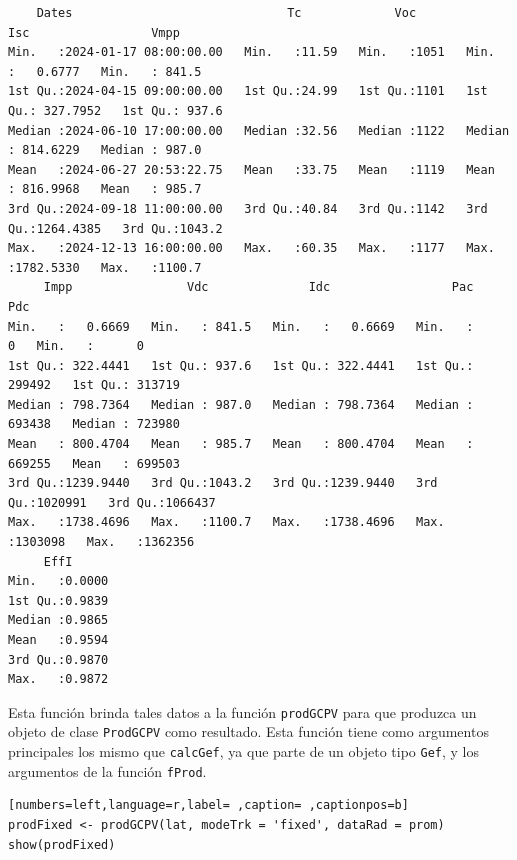 \begin{verbatim}
    Dates                              Tc             Voc            Isc                 Vmpp       
Min.   :2024-01-17 08:00:00.00   Min.   :11.59   Min.   :1051   Min.   :   0.6777   Min.   : 841.5  
1st Qu.:2024-04-15 09:00:00.00   1st Qu.:24.99   1st Qu.:1101   1st Qu.: 327.7952   1st Qu.: 937.6  
Median :2024-06-10 17:00:00.00   Median :32.56   Median :1122   Median : 814.6229   Median : 987.0  
Mean   :2024-06-27 20:53:22.75   Mean   :33.75   Mean   :1119   Mean   : 816.9968   Mean   : 985.7  
3rd Qu.:2024-09-18 11:00:00.00   3rd Qu.:40.84   3rd Qu.:1142   3rd Qu.:1264.4385   3rd Qu.:1043.2  
Max.   :2024-12-13 16:00:00.00   Max.   :60.35   Max.   :1177   Max.   :1782.5330   Max.   :1100.7  
     Impp                Vdc              Idc                 Pac               Pdc         
Min.   :   0.6669   Min.   : 841.5   Min.   :   0.6669   Min.   :      0   Min.   :      0  
1st Qu.: 322.4441   1st Qu.: 937.6   1st Qu.: 322.4441   1st Qu.: 299492   1st Qu.: 313719  
Median : 798.7364   Median : 987.0   Median : 798.7364   Median : 693438   Median : 723980  
Mean   : 800.4704   Mean   : 985.7   Mean   : 800.4704   Mean   : 669255   Mean   : 699503  
3rd Qu.:1239.9440   3rd Qu.:1043.2   3rd Qu.:1239.9440   3rd Qu.:1020991   3rd Qu.:1066437  
Max.   :1738.4696   Max.   :1100.7   Max.   :1738.4696   Max.   :1303098   Max.   :1362356  
     EffI       
Min.   :0.0000  
1st Qu.:0.9839  
Median :0.9865  
Mean   :0.9594  
3rd Qu.:0.9870  
Max.   :0.9872
\end{verbatim}

Esta función brinda tales datos a la función \texttt{prodGCPV} para que produzca un objeto de clase \texttt{ProdGCPV} como resultado. Esta función tiene como argumentos principales los mismo que \texttt{calcGef}, ya que parte de un objeto tipo \texttt{Gef}, y los argumentos de la función \texttt{fProd}.
\begin{lstlisting}[numbers=left,language=r,label= ,caption= ,captionpos=b]
prodFixed <- prodGCPV(lat, modeTrk = 'fixed', dataRad = prom)
show(prodFixed)
\end{lstlisting}

